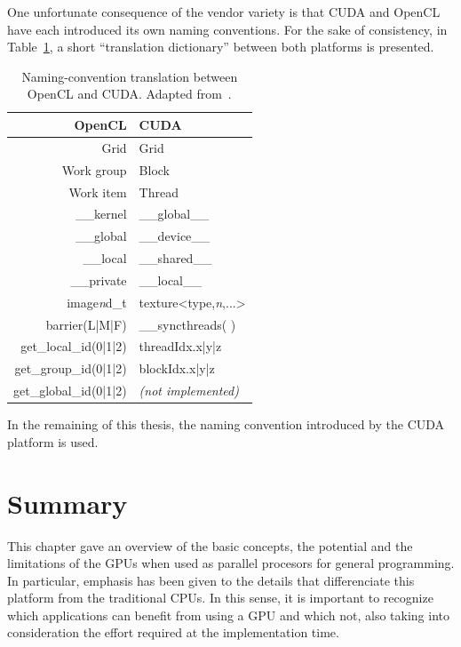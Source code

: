 One unfortunate consequence of the vendor variety is that CUDA and
OpenCL have each introduced its own naming conventions. For the sake
of consistency, in Table~\ref{tab:02-CUDA_OpenCL_translation}, a
short ``translation dictionary'' between both platforms is presented.

\begin{table}
\caption{Naming-convention translation between OpenCL and CUDA. Adapted from~\cite{Kloeckner_CUDA.OpenCL.dictionary:2011}.\label{tab:02-CUDA_OpenCL_translation}}


\centering

\begin{tabular}{r|l}
\hline 
\textbf{OpenCL} & \textbf{CUDA}\tabularnewline[\doublerulesep]
\hline 
Grid & Grid\tabularnewline
Work group & Block\tabularnewline
Work item & Thread\tabularnewline
\_\_kernel & \_\_global\_\_\tabularnewline
\_\_global & \_\_device\_\_\tabularnewline
\_\_local & \_\_shared\_\_\tabularnewline
\_\_private & \_\_local\_\_\tabularnewline
image\emph{n}d\_t & texture<type,\emph{n},...>\tabularnewline
barrier(L|M|F) & \_\_syncthreads( )\tabularnewline
get\_local\_id(0|1|2) & threadIdx.x|y|z\tabularnewline
get\_group\_id(0|1|2) & blockIdx.x|y|z\tabularnewline
get\_global\_id(0|1|2) & \emph{(not implemented)}\tabularnewline
\hline 
\end{tabular}
\end{table}


In the remaining of this thesis, the naming convention introduced
by the CUDA platform is used.


\section{Summary}

This chapter gave an overview of the basic concepts, the potential
and the limitations of the GPUs when used as parallel procesors for
general programming. In particular, emphasis has been given to the
details that differenciate this platform from the traditional CPUs.
In this sense, it is important to recognize which applications can
benefit from using a GPU and which not, also taking into consideration
the effort required at the implementation time.
